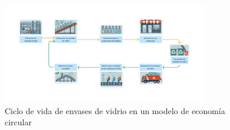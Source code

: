 \begin{figure}[!tb]
    \centering
    \includegraphics[width=0.8\textwidth]{Figures/glass-lifecycle.png}
    \caption{Ciclo de vida de envases de vidrio en un modelo de economía circular}
    \label{fig:glass-lifecycle}
\end{figure}


